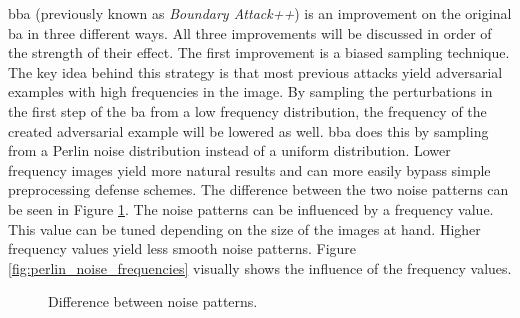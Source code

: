 \gls{bba} \cite{brunner_guessing_2019} (previously known as \textit{Boundary Attack++}) is an improvement on the original \gls{ba} in three different ways. All three improvements will be discussed in order of the strength of their effect. The first improvement is a biased sampling technique. The key idea behind this strategy is that most previous attacks yield adversarial examples with high frequencies in the image. By sampling the perturbations in the first step of the \gls{ba} from a low frequency distribution, the frequency of the created adversarial example will be lowered as well. \gls{bba} does this by sampling from a Perlin noise \cite{perlin} distribution instead of a uniform distribution. Lower frequency images yield more natural results and can more easily bypass simple preprocessing defense schemes. The difference between the two noise patterns can be seen in Figure \ref{fig:noise_differences}. The noise patterns can be influenced by a frequency value. This value can be tuned depending on the size of the images at hand. Higher frequency values yield less smooth noise patterns. Figure \ref{fig:perlin_noise_frequencies} visually shows the influence of the frequency values.\\

\begin{figure}
	\centering
	\qquad
	\caption[Difference between noise patterns]{Difference between noise patterns.}
	\label{fig:noise_differences}
\end{figure}

